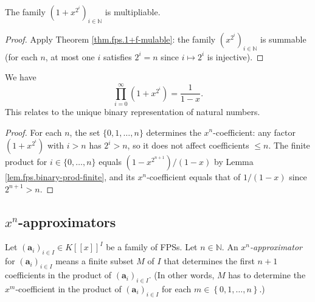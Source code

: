 \begin{lemma}
\label{lem.fps.binary-prod-mulable}
\leanhelper
\leanok
The family $\left(1+x^{2^{i}}\right)_{i\in\mathbb{N}}$ is multipliable.
\end{lemma}

\begin{proof}
\leanok
Apply Theorem \ref{thm.fps.1+f-mulable}: the family
$\left(x^{2^{i}}\right)_{i\in\mathbb{N}}$ is summable (for each $n$, at most
one $i$ satisfies $2^i = n$ since $i\mapsto 2^i$ is injective).
\end{proof}

\begin{proposition}
\label{prop.fps.binary-prod-infinite}
\leanhelper
\leanok
We have
\[
\prod_{i=0}^{\infty}\left(1+x^{2^{i}}\right) = \frac{1}{1-x}.
\]
This relates to the unique binary representation of natural numbers.
\end{proposition}

\begin{proof}
\leanok
For each $n$, the set $\{0,1,\ldots,n\}$ determines the $x^n$-coefficient:
any factor $\left(1+x^{2^i}\right)$ with $i > n$ has $2^i > n$, so
it does not affect coefficients $\le n$. The finite product for
$i\in\{0,\ldots,n\}$ equals $\left(1-x^{2^{n+1}}\right)/(1-x)$
by Lemma \ref{lem.fps.binary-prod-finite}, and its $x^n$-coefficient
equals that of $1/(1-x)$ since $2^{n+1} > n$.
\end{proof}

\subsection{$x^n$-approximators}

\begin{definition}
\label{def.fps.infprod-approx}
\leantarget
\leanok
Let $\left(\mathbf{a}_{i}\right)_{i\in I}\in K\left[\left[x\right]\right]^{I}$
be a family of FPSs. Let $n\in\mathbb{N}$. An $x^{n}$\emph{-approximator} for
$\left(\mathbf{a}_{i}\right)_{i\in I}$ means a finite subset $M$ of $I$ that
determines the first $n+1$ coefficients in the product of
$\left(\mathbf{a}_{i}\right)_{i\in I}$. (In other words, $M$ has to determine
the $x^{m}$-coefficient in the product of $\left(\mathbf{a}_{i}\right)_{i\in I}$
for each $m\in\left\{0,1,\ldots,n\right\}$.)
\end{definition}

